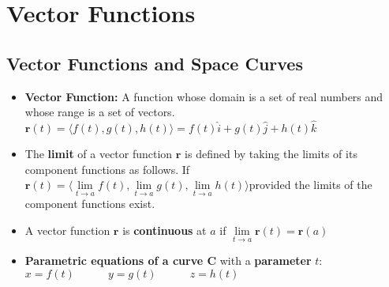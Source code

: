 \documentclass{report}
\begin{document}
\chapter{Vector Functions}
	\section{Vector Functions and Space Curves}
		\begin{itemize}\addtolength{\leftskip}{2em}
			\item \textbf{Vector Function:} A function whose domain is a set of real numbers and whose range is a set of vectors.
				\subitem $\mathbf{r}(t)=\langle f(t),g(t),h(t) \rangle = f(t)\hat{i}+g(t)\hat{j}+h(t)\hat{k}$ 
			\item The \textbf{limit} of a vector function $\mathbf{r}$ is defined by taking the limits of its component functions as follows.
				\subitem If $\mathbf{r}(t)=\langle \lim\limits_{t\rightarrow a}f(t),\lim\limits_{t\rightarrow a}g(t),\lim\limits_{t\rightarrow a}h(t) \rangle$\newline provided the limits of the component functions exist.
			\item A vector function $\mathbf{r}$ is \textbf{continuous} at $a$ if 
				\subitem \Large$\lim\limits_{t\rightarrow a}\mathbf{r}(t)=\mathbf{r}(a)$
			\large\item \textbf{Parametric equations of a curve C} with a \textbf{parameter} $t$:
				\subitem \Large $x=f(t)\quad\quad\quad y=g(t)\quad\quad\quad z=h(t)$
		\end{itemize}
\end{document}
